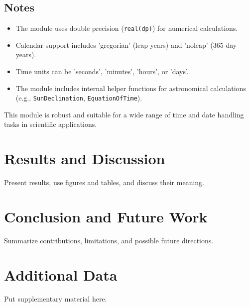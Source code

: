 \documentclass[12pt,a4paper]{report}
\begin{document}
\section{Notes}
\begin{itemize}
\item The module uses double precision (\texttt{real(dp)}) for numerical calculations.
\item Calendar support includes 'gregorian' (leap years) and 'noleap' (365-day years).
\item Time units can be 'seconds', 'minutes', 'hours', or 'days'.
\item The module includes internal helper functions for astronomical calculations (e.g., \texttt{SunDeclination}, \texttt{EquationOfTime}).
\end{itemize}

This module is robust and suitable for a wide range of time and date handling tasks in scientific applications.


\chapter{Results and Discussion}
Present results, use figures and tables, and discuss their meaning.

\chapter{Conclusion and Future Work}
Summarize contributions, limitations, and possible future directions.

\appendix
\chapter{Additional Data}
Put supplementary material here.

\printbibliography
\end{document}
